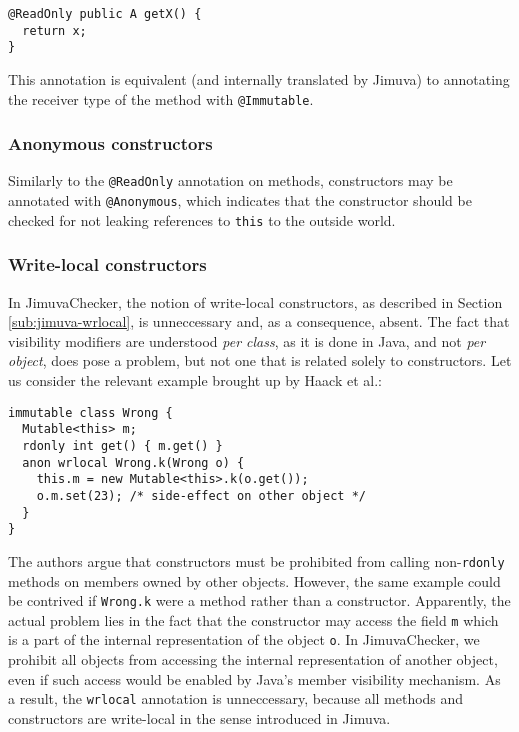 \documentclass{pracamgr}
\theoremstyle{all}
\begin{document}
\begin{lstlisting}
@ReadOnly public A getX() { 
  return x; 
}
\end{lstlisting}
This annotation is equivalent (and internally translated by Jimuva) to 
annotating the receiver type of the method with \texttt{@Immutable}.

\subsubsection{Anonymous constructors}

Similarly to the \texttt{@ReadOnly} annotation on methods,
constructors may be annotated with \texttt{@Anonymous}, which
indicates that the constructor should be checked for not leaking
references to \texttt{this} to the outside world.

\subsubsection{Write-local constructors}
\label{sub:mirroring-writelocal}

In JimuvaChecker, the notion of write-local constructors, as described
in Section \ref{sub:jimuva-wrlocal}, is unneccessary and, as a
consequence, absent. The fact that visibility modifiers are understood
\emph{per class}, as it is done in Java, and not \emph{per object},
does pose a problem, but not one that is related solely to
constructors. Let us consider the relevant example brought up by Haack
et al.:
\begin{lstlisting}[morekeywords={immutable, anon, wrlocal, rdonly}]
immutable class Wrong {
  Mutable<this> m; 
  rdonly int get() { m.get() }
  anon wrlocal Wrong.k(Wrong o) {
    this.m = new Mutable<this>.k(o.get()); 
    o.m.set(23); /* side-effect on other object */
  }
}
\end{lstlisting}
The authors argue that constructors must be prohibited from calling
non-\texttt{rdonly} methods on members owned by other
objects. However, the same example could be contrived if
\texttt{Wrong.k} were a method rather than a constructor. Apparently,
the actual problem lies in the fact that the constructor may access
the field \texttt{m} which is a part of the internal representation of
the object \texttt{o}. In JimuvaChecker, we prohibit all objects from
accessing the internal representation of another object, even if such
access would be enabled by Java's member visibility mechanism. As a
result, the \texttt{wrlocal} annotation is unneccessary, because all
methods and constructors are write-local in the sense introduced in
Jimuva.
\end{document}
